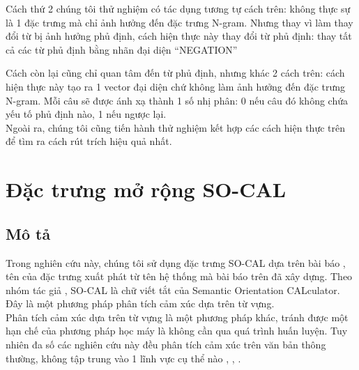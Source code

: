 
Cách thứ 2 chúng tôi thử nghiệm có tác dụng tương tự cách trên: không thực sự là 1 đặc trưng mà chỉ ảnh hưởng đến đặc trưng N-gram. Nhưng thay vì làm thay đổi từ bị ảnh hưởng phủ định, cách hiện thực này thay  đổi từ phủ định: thay tất cả các từ phủ định bằng nhãn đại diện ``NEGATION''\\


Cách còn lại cũng chỉ quan tâm đến từ phủ định, nhưng khác 2 cách trên: cách hiện thực này tạo ra 1 vector đại diện chứ không làm ảnh hưởng đến đặc trưng N-gram. Mỗi câu sẽ được ánh xạ thành 1 số nhị phân: 0 nếu câu đó không chứa yếu tố phủ định nào, 1 nếu ngược lại.\\

Ngoài ra, chúng tôi cũng tiến hành thử nghiệm kết hợp các cách hiện thực trên để tìm ra cách rút trích hiệu quả nhất.
\section{Đặc trưng mở rộng SO-CAL} \label{sec:socal}
\subsection*{Mô tả}
Trong nghiên cứu này, chúng tôi sử dụng đặc trưng SO-CAL dựa trên bài báo \cite{taboada2011lexicon}, tên của đặc trưng xuất phát từ tên hệ thống mà bài báo trên đã xây dựng. Theo nhóm tác giả \cite{taboada2011lexicon}, SO-CAL là chữ viết tắt của Semantic Orientation CALculator. Đây là một phương pháp phân tích cảm xúc dựa trên từ vựng.\\

Phân tích cảm xúc dựa trên từ vựng là một phương pháp khác, tránh được một hạn chế của phương pháp học máy là không cần qua quá trình huấn luyện. Tuy nhiên đa số các nghiên cứu này đều phân tích cảm xúc trên văn bản thông thường, không tập trung vào 1 lĩnh vực cụ thể nào \cite{taboada2011lexicon}, \cite{ohana2009sentiment}, \cite{Giachanou2016}. \\

